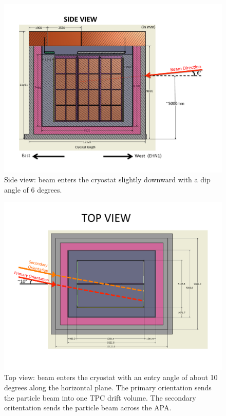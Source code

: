\begin{figure}[h]
  \centering
\includegraphics[scale=0.6]{figures/BeamPos_SideView.pdf}
  \caption{Side view: beam enters the cryostat slightly downward with a dip angle of 6 degrees.  }
  \label{fig:BP_SideView}
\end{figure}

\begin{figure}[h]
  \centering
\includegraphics[scale=0.6]{figures/BeamPos_TopView.pdf}
  \caption{Top view: beam enters the cryostat with an entry angle of about 10 degrees along the horizontal plane. The primary orientation sends the particle beam into one TPC drift volume. The secondary oritentation sends the particle beam across the APA. }
  \label{fig:BP_TopView}
\end{figure}

